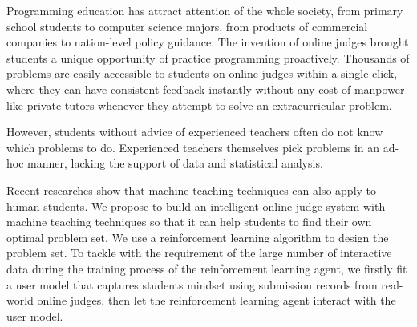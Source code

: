 \begin{englishabstract}

    Programming education has attract attention of the whole society,
    from primary school students to computer science majors,
    from products of commercial companies to nation-level policy guidance.
    The invention of online judges brought students a unique opportunity of practice programming proactively.
    Thousands of problems are easily accessible to students on online judges within a single click,
    where they can have consistent feedback instantly without any cost of manpower like private tutors
    whenever they attempt to solve an extracurricular problem.

    However, students without advice of experienced teachers often do not know which problems to do.
    Experienced teachers themselves pick problems in an ad-hoc manner,
    lacking the support of data and statistical analysis.

    Recent researches show that machine teaching techniques can also apply to human students.
    We propose to build an intelligent online judge system with machine teaching techniques
    so that it can help students to find their own optimal problem set.
    We use a reinforcement learning algorithm to design the problem set.
    To tackle with the requirement of the large number of interactive data
    during the training process of the reinforcement learning agent,
    we firstly fit a user model that captures students mindset using submission records from real-world online judges,
    then let the reinforcement learning agent interact with the user model.


\end{englishabstract}

